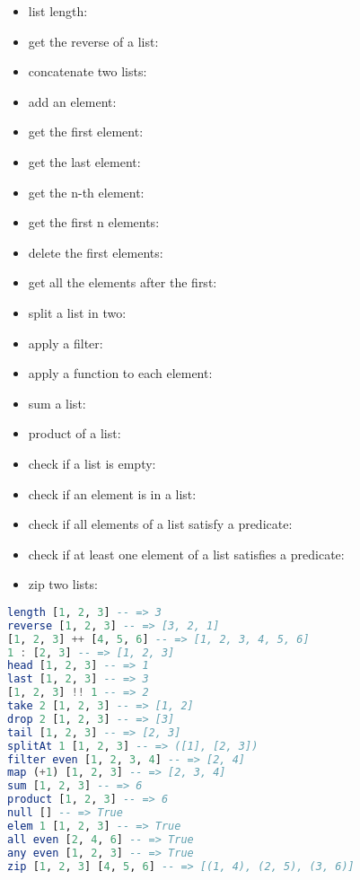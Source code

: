 \documentclass[a4paper,landscape,10pt]{article}
\begin{document}
\begin{multicols*}{2}
\begin{itemize}
    \item list length: 
    \item get the reverse of a list: 
    \item concatenate two lists: 
    \item add an element: 
    \item get the first element: 
    \item get the last element: 
    \item get the n-th element: 
    \item get the first n elements: 
    \item delete the first  elements: 
    \item get all the elements after the first: 
    \item split a list in two: 
    \item apply a filter: 
    \item apply a function to each element: 
    \item sum a list: 
    \item product of a list: 
    \item check if a list is empty: 
    \item check if an element is in a list: 
    \item check if all elements of a list satisfy a predicate: 
    \item check if at least one element of a list satisfies a predicate: 
    \item zip two lists: 
  \end{itemize}

  \begin{lstlisting}[language=Haskell]
length [1, 2, 3] -- => 3
reverse [1, 2, 3] -- => [3, 2, 1]
[1, 2, 3] ++ [4, 5, 6] -- => [1, 2, 3, 4, 5, 6]
1 : [2, 3] -- => [1, 2, 3]
head [1, 2, 3] -- => 1
last [1, 2, 3] -- => 3
[1, 2, 3] !! 1 -- => 2
take 2 [1, 2, 3] -- => [1, 2]
drop 2 [1, 2, 3] -- => [3]
tail [1, 2, 3] -- => [2, 3]
splitAt 1 [1, 2, 3] -- => ([1], [2, 3])
filter even [1, 2, 3, 4] -- => [2, 4]
map (+1) [1, 2, 3] -- => [2, 3, 4]
sum [1, 2, 3] -- => 6
product [1, 2, 3] -- => 6
null [] -- => True
elem 1 [1, 2, 3] -- => True
all even [2, 4, 6] -- => True
any even [1, 2, 3] -- => True
zip [1, 2, 3] [4, 5, 6] -- => [(1, 4), (2, 5), (3, 6)]
\end{lstlisting}


\end{multicols*}
\end{document}
